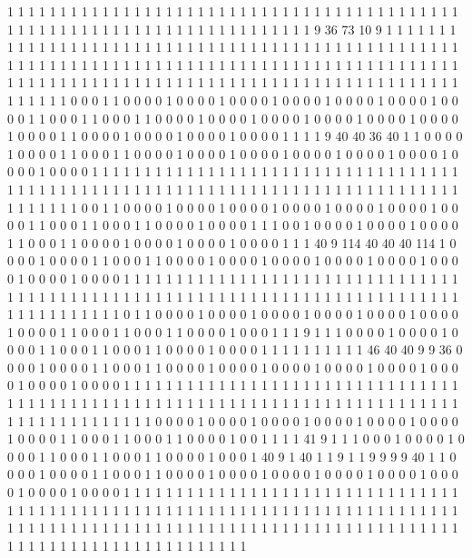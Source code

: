 1 1 1 1 1 1 1 1 1 1 1 1 1 1 1 1 1 1 1 1
1 1 1 1 1 1 1 1 1 1 1 1 1 1 1 1 1 1 1 1
1 1 1 1 1 1 1 1 1 1 1 1 1 1 1 1 1 1 1 1
1 1 1 1 1 1 1 1 1 1 1 1 9 36 73 10 9 1 1 1
1 1 1 1 1 1 1 1 1 1 1 1 1 1 1 1 1 1 1 1
1 1 1 1 1 1 1 1 1 1 1 1 1 1 1 1 1 1 1 1
1 1 1 1 1 1 1 1 1 1 1 1 1 1 1 1 1 1 1 1
1 1 1 1 1 1 1 1 1 1 1 1 1 1 1 1 1 1 1 1
1 1 1 1 1 1 1 1 1 1 1 1 1 1 1 1 1 1 1 1
1 1 1 1 1 1 1 1 1 1 1 1 1 1 1 1 1 1 1 1
1 1 1 1 1 1 1 1 1 1 1 1 1 1 1 1 1 1 1 0
0 0 1 1 0 0 0 0 1 0 0 0 0 1 0 0 0 0 1 0
0 0 0 1 0 0 0 0 1 0 0 0 0 1 0 0 0 0 1 1
0 0 0 1 1 0 0 0 1 1 0 0 0 0 1 0 0 0 0 1
0 0 0 0 1 0 0 0 0 1 0 0 0 0 1 0 0 0 0 1
0 0 0 0 1 1 0 0 0 0 1 0 0 0 0 1 0 0 0 0
1 0 0 0 0 1 1 1 1 9 40 40 36 40 1 1 0 0 0 0
1 0 0 0 0 1 1 0 0 0 1 1 0 0 0 0 1 0 0 0
0 1 0 0 0 0 1 0 0 0 0 1 0 0 0 0 1 0 0 0
0 1 0 0 0 0 1 0 0 0 0 1 1 1 1 1 1 1 1 1
1 1 1 1 1 1 1 1 1 1 1 1 1 1 1 1 1 1 1 1
1 1 1 1 1 1 1 1 1 1 1 1 1 1 1 1 1 1 1 1
1 1 1 1 1 1 1 1 1 1 1 1 1 1 1 1 1 1 1 1
1 1 1 1 1 1 1 1 1 1 1 1 1 1 1 1 0 0 1 1
0 0 0 0 1 0 0 0 0 1 0 0 0 0 1 0 0 0 0 1
0 0 0 0 1 0 0 0 0 1 0 0 0 0 1 1 0 0 0 1
1 0 0 0 1 1 0 0 0 0 1 0 0 0 0 1 1 1 0 0
1 0 0 0 0 1 0 0 0 0 1 0 0 0 0 1 1 0 0 0
1 1 0 0 0 0 1 0 0 0 0 1 0 0 0 0 1 0 0 0
0 1 1 1 40 9 114 40 40 40 114 1 0 0 0 0 1 0 0 0
0 1 1 0 0 0 1 1 0 0 0 0 1 0 0 0 0 1 0 0
0 0 1 0 0 0 0 1 0 0 0 0 1 0 0 0 0 1 0 0
0 0 1 0 0 0 0 1 1 1 1 1 1 1 1 1 1 1 1 1
1 1 1 1 1 1 1 1 1 1 1 1 1 1 1 1 1 1 1 1
1 1 1 1 1 1 1 1 1 1 1 1 1 1 1 1 1 1 1 1
1 1 1 1 1 1 1 1 1 1 1 1 1 1 1 1 1 1 1 1
1 1 1 1 1 1 1 1 1 1 1 1 1 0 1 1 0 0 0 0
1 0 0 0 0 1 0 0 0 0 1 0 0 0 0 1 0 0 0 0
1 0 0 0 0 1 0 0 0 0 1 1 0 0 0 1 1 0 0 0
1 1 0 0 0 0 1 0 0 0 1 1 1 9 1 1 1 0 0 0
0 1 0 0 0 0 1 0 0 0 0 1 1 0 0 0 1 1 0 0
0 1 1 0 0 0 0 1 0 0 0 0 1 1 1 1 1 1 1 1
1 1 46 40 40 9 9 36 0 0 0 0 1 0 0 0 0 1 1 0
0 0 1 1 0 0 0 0 1 0 0 0 0 1 0 0 0 0 1 0
0 0 0 1 0 0 0 0 1 0 0 0 0 1 0 0 0 0 1 0
0 0 0 1 1 1 1 1 1 1 1 1 1 1 1 1 1 1 1 1
1 1 1 1 1 1 1 1 1 1 1 1 1 1 1 1 1 1 1 1
1 1 1 1 1 1 1 1 1 1 1 1 1 1 1 1 1 1 1 1
1 1 1 1 1 1 1 1 1 1 1 1 1 1 1 1 1 1 1 1
1 1 1 1 1 1 1 1 1 1 1 1 0 0 0 0 1 0 0 0
0 1 0 0 0 0 1 0 0 0 0 1 0 0 0 0 1 0 0 0
0 1 0 0 0 0 1 1 0 0 0 1 1 0 0 0 1 1 0 0
0 0 1 0 0 1 1 1 1 41 9 1 1 1 0 0 0 1 0 0
0 0 1 0 0 0 0 1 1 0 0 0 1 1 0 0 0 1 1 0
0 0 0 1 0 0 0 1 40 9 1 40 1 1 9 1 1 9 9 9
9 40 1 1 0 0 0 0 1 0 0 0 0 1 1 0 0 0 1 1
0 0 0 0 1 0 0 0 0 1 0 0 0 0 1 0 0 0 0 1
0 0 0 0 1 0 0 0 0 1 0 0 0 0 1 0 0 0 0 1
1 1 1 1 1 1 1 1 1 1 1 1 1 1 1 1 1 1 1 1
1 1 1 1 1 1 1 1 1 1 1 1 1 1 1 1 1 1 1 1
1 1 1 1 1 1 1 1 1 1 1 1 1 1 1 1 1 1 1 1
1 1 1 1 1 1 1 1 1 1 1 1 1 1 1 1 1 1 1 1
1 1 1 1 1 1 1 1 1 1 1 1 1 1 1 1 1 1 1 1
1 1 1 1 1 1 1 1 1 1 1 1 1 1 1 1 1 1 1 1
1 1 1 1 1 1 1 1 1 1 1 1 1 1 1 1 1 1 1 1
